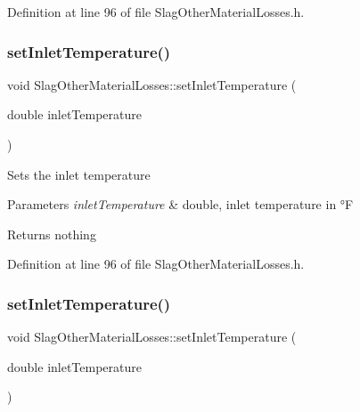 Definition at line 96 of file Slag\+Other\+Material\+Losses.\+h.

\mbox{\label{class_slag_other_material_losses_a47bb0a61de501e3e9b7bd2bf2651eb8c}} 
\subsubsection{\texorpdfstring{set\+Inlet\+Temperature()}{setInletTemperature()}\hspace{0.1cm}{\footnotesize\ttfamily [2/3]}}
{\footnotesize\ttfamily void Slag\+Other\+Material\+Losses\+::set\+Inlet\+Temperature (\begin{DoxyParamCaption}\item[{double}]{inlet\+Temperature }\end{DoxyParamCaption})\hspace{0.3cm}{\ttfamily [inline]}}

Sets the inlet temperature


\begin{DoxyParams}{Parameters}
{\em inlet\+Temperature} & double, inlet temperature in °F\\
\hline
\end{DoxyParams}
\begin{DoxyReturn}{Returns}
nothing 
\end{DoxyReturn}


Definition at line 96 of file Slag\+Other\+Material\+Losses.\+h.

\mbox{\label{class_slag_other_material_losses_a47bb0a61de501e3e9b7bd2bf2651eb8c}} 
\subsubsection{\texorpdfstring{set\+Inlet\+Temperature()}{setInletTemperature()}\hspace{0.1cm}{\footnotesize\ttfamily [3/3]}}
{\footnotesize\ttfamily void Slag\+Other\+Material\+Losses\+::set\+Inlet\+Temperature (\begin{DoxyParamCaption}\item[{double}]{inlet\+Temperature }\end{DoxyParamCaption})\hspace{0.3cm}{\ttfamily [inline]}}

